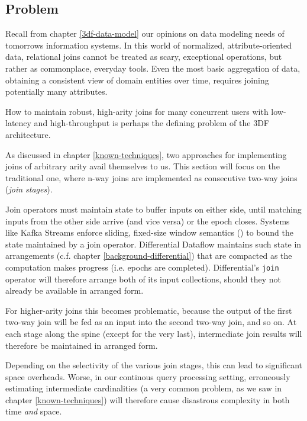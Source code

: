 \documentclass[../catalog.tex]{subfiles}
\begin{document}
\subsection{Problem}

Recall from chapter \ref{3df-data-model} our opinions on data modeling
needs of tomorrows information systems. In this world of normalized,
attribute-oriented data, relational joins cannot be treated as scary,
exceptional operations, but rather as commonplace, everyday
tools. Even the most basic aggregation of data, obtaining a consistent
view of domain entities over time, requires joining potentially many
attributes.

How to maintain robust, high-arity joins for many concurrent users
with low-latency and high-throughput is perhaps the defining problem
of the 3DF architecture.

As discussed in chapter \ref{known-techniques}, two approaches for
implementing joins of arbitrary arity avail themselves to us. This
section will focus on the traditional one, where n-way joins are
implemented as consecutive two-way joins (\emph{join stages}).

Join operators must maintain state to buffer inputs on either side,
until matching inputs from the other side arrive (and vice versa) or
the epoch closes. Systems like Kafka Streams enforce sliding,
fixed-size window semantics (\cite{kafkadocs}) to bound the state
maintained by a join operator. Differential Dataflow maintains such
state in arrangements (c.f. chapter \ref{background-differential})
that are compacted as the computation makes progress (i.e. epochs are
completed). Differential's \texttt{join} operator will therefore
arrange both of its input collections, should they not already be
available in arranged form.

For higher-arity joins this becomes problematic, because the output of
the first two-way join will be fed as an input into the second two-way
join, and so on. At each stage along the spine (except for the very
last), intermediate join results will therefore be maintained in
arranged form.

Depending on the selectivity of the various join stages, this can lead
to significant space overheads. Worse, in our continous query
processing setting, erroneously estimating intermediate cardinalities
(a very common problem, as we saw in chapter \ref{known-techniques})
will therefore cause disastrous complexity in both time \emph{and}
space.
\end{document}

